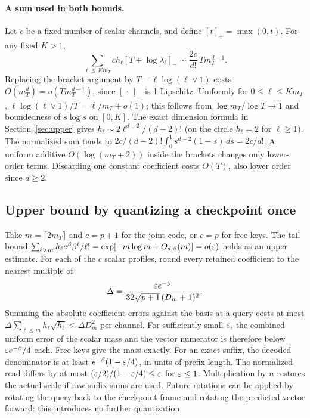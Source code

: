 \paragraph{A sum used in both bounds.}
Let $c$ be a fixed number of scalar channels, and define $[t]_+=\max(0,t)$. For any fixed $K>1$,
\begin{equation}
 \sum_{\ell\le K m_T} c h_\ell[T+\log\lambda_\ell]_+
 \sim \frac{2c}{d!}\,T m_T^{d-1}. \label{eq:shellsum}
\end{equation}
Replacing the bracket argument by $T-\ell\log(\ell\vee1)$ costs $O(m_T^{d})=o(Tm_T^{d-1})$, since $[\,\cdot\,]_+$ is 1-Lipschitz. Uniformly for $0\le\ell\le K m_T$, $\ell\log(\ell\vee1)/T=\ell/m_T+o(1)$; this follows from $\log m_T/\log T\to1$ and boundedness of $s\log s$ on $[0,K]$. The exact dimension formula in Section~\ref{sec:upper} gives $h_\ell\sim2\ell^{d-2}/(d-2)!$ (on the circle $h_\ell=2$ for $\ell\ge1$). The normalized sum tends to $2c/(d-2)!\int_0^1 s^{d-2}(1-s)\,ds=2c/d!$. A uniform additive $O(\log(m_T+2))$ inside the brackets changes only lower-order terms. Discarding one constant coefficient costs $O(T)$, also lower order since $d\ge2$.

\subsection{Upper bound by quantizing a checkpoint once}
Take $m=\lceil 2m_T\rceil$ and $c=p+1$ for the joint code, or $c=p$ for free keys. The tail bound $\sum_{\ell>m}h_\ell e^\beta\beta^\ell/\ell!=\exp[-m\log m+O_{d,\beta}(m)]=o(\varepsilon)$ holds as an upper estimate. For each of the $c$ scalar profiles, round every retained coefficient to the nearest multiple of
\[
 \Delta=\frac{\varepsilon e^{-\beta}}{32\sqrt{p+1}\,(D_m+1)^2}.
\]
Summing the absolute coefficient errors against the basis at a query costs at most $\Delta\sum_{\ell\le m}h_\ell\sqrt{h_\ell}\le \Delta D_m^2$ per channel. For sufficiently small $\varepsilon$, the combined uniform error of the scalar mass and the vector numerator is therefore below $\varepsilon e^{-\beta}/4$ each. Free keys give the mass exactly. For an exact suffix, the decoded denominator is at least $e^{-\beta}(1-\varepsilon/4)$, in units of prefix length. The normalized read differs by at most $(\varepsilon/2)/(1-\varepsilon/4)\le\varepsilon$ for $\varepsilon\le1$. Multiplication by $n$ restores the actual scale if raw suffix sums are used. Future rotations can be applied by rotating the query back to the checkpoint frame and rotating the predicted vector forward; this introduces no further quantization.

